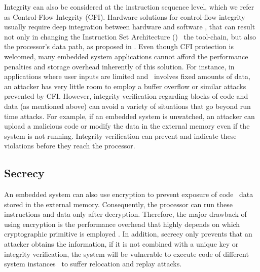 Integrity can also be considered at the instruction sequence level, which we refer as Control-Flow Integrity (CFI). Hardware solutions for control-flow integrity usually require deep integration between hardware and software \cite{Davi2015:HAFIX}, that can result not only in changing the Instruction Set Architecture (\isa) \andor~the tool-chain, but also the processor's data path, as proposed in \cite{Gelbart2005:CODESSEAL, Kanuparthi2012:DynamicIntegrity}. Even though CFI protection is welcomed, many embedded system applications cannot afford the performance penalties and storage overhead inherently of this solution. For instance, in applications where user inputs are limited and \io~involves fixed amounts of data, an attacker has very little room to employ a buffer overflow or similar attacks prevented by CFI. However, integrity verification regarding blocks of code and data (as mentioned above) can avoid a variety of situations that go beyond run time attacks. For example, if an embedded system is unwatched, an attacker can upload a malicious code or modify the data in the external memory even if the system is not running. Integrity verification can prevent and indicate these violations before they reach the processor.


\subsection{Secrecy}
\label{subsec:Secrecy}

An embedded system can also use encryption to prevent exposure of code \andor~data stored in the external memory. Consequently, the processor can run these instructions and data only after decryption. Therefore, the major drawback of using encryption is the performance overhead that highly depends on which cryptographic primitive is employed \cite{Suh2007:PUFs}. In addition, secrecy only prevents that an attacker obtains the information, if it is not combined with a unique key or integrity verification, the system will be vulnerable to execute code of different system instances \andor~to suffer relocation and replay attacks\cite{Elbaz2009}.